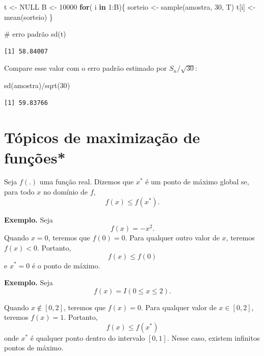 \documentclass[
  letterpaper,
  DIV=11,
  numbers=noendperiod]{scrartcl}
\newenvironment{Shaded}{\begin{snugshade}}{\end{snugshade}}
\newcommand{\CommentTok}[1]{\textcolor[rgb]{0.37,0.37,0.37}{#1}}
\newcommand{\ConstantTok}[1]{\textcolor[rgb]{0.56,0.35,0.01}{#1}}
\newcommand{\ControlFlowTok}[1]{\textcolor[rgb]{0.00,0.23,0.31}{\textbf{#1}}}
\newcommand{\DecValTok}[1]{\textcolor[rgb]{0.68,0.00,0.00}{#1}}
\newcommand{\FunctionTok}[1]{\textcolor[rgb]{0.28,0.35,0.67}{#1}}
\newcommand{\NormalTok}[1]{\textcolor[rgb]{0.00,0.23,0.31}{#1}}
\newcommand{\OtherTok}[1]{\textcolor[rgb]{0.00,0.23,0.31}{#1}}
\newcommand{\SpecialCharTok}[1]{\textcolor[rgb]{0.37,0.37,0.37}{#1}}
\begin{document}
\begin{Shaded}
\begin{Highlighting}[]
\NormalTok{t }\OtherTok{\textless{}{-}} \ConstantTok{NULL}
\NormalTok{B }\OtherTok{\textless{}{-}} \DecValTok{10000}
\ControlFlowTok{for}\NormalTok{( i }\ControlFlowTok{in} \DecValTok{1}\SpecialCharTok{:}\NormalTok{B)\{ }
\NormalTok{sorteio }\OtherTok{\textless{}{-}} \FunctionTok{sample}\NormalTok{(amostra, }\DecValTok{30}\NormalTok{, T)}
\NormalTok{t[i] }\OtherTok{\textless{}{-}} \FunctionTok{mean}\NormalTok{(sorteio)}
\NormalTok{\}}

\CommentTok{\# erro padrão}
\FunctionTok{sd}\NormalTok{(t)}
\end{Highlighting}
\end{Shaded}

\begin{verbatim}
[1] 58.84007
\end{verbatim}

Compare esse valor com o erro padrão estimado por \(S_n/\sqrt{30}\):

\begin{Shaded}
\begin{Highlighting}[]
\FunctionTok{sd}\NormalTok{(amostra)}\SpecialCharTok{/}\FunctionTok{sqrt}\NormalTok{(}\DecValTok{30}\NormalTok{)}
\end{Highlighting}
\end{Shaded}

\begin{verbatim}
[1] 59.83766
\end{verbatim}

\section{Tópicos de maximização de
funções*}\label{tuxf3picos-de-maximizauxe7uxe3o-de-funuxe7uxf5es}

Seja \(f(.)\) uma função real. Dizemos que \(x^*\) é um ponto de máximo
global se, para todo \(x\) no domínio de \(f\), \[f(x)\leq f(x^*).\]

\textbf{Exemplo.} Seja \[f(x)= -x^2.\] Quando \(x=0\), teremos que
\(f(0)=0\). Para qualquer outro valor de \(x\), teremos \(f(x)<0\).
Portanto, \[f(x)\leq f(0)\] e \(x^*=0\) é o ponto de máximo.

\textbf{Exemplo.} Seja \[f(x)= I(0\leq x \leq 2).\]

Quando \(x\notin[0,2]\), teremos que \(f(x)=0\). Para qualquer valor de
\(x\in[0,2]\), teremos \(f(x)=1\). Portanto, \[f(x)\leq f(x^*)\] onde
\(x^*\) é qualquer ponto dentro do intervalo \([0,1]\). Nesse caso,
existem infinitos pontos de máximo.
\end{document}
